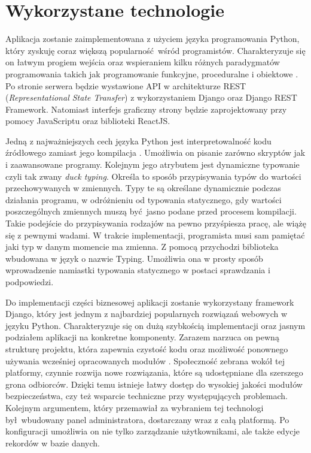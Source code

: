 \section{Wykorzystane technologie}
Aplikacja zostanie zaimplementowana z użyciem języka programowania Python, który zyskuję coraz większą popularność wśród programistów. Charakteryzuje się on łatwym progiem wejścia oraz wspieraniem kilku różnych paradygmatów programowania takich jak programowanie funkcyjne, proceduralne i obiektowe \cite{book_3}. Po stronie serwera będzie wystawione API w architekturze REST (\textit{Representational State Transfer}) z wykorzystaniem Django oraz Django REST Framework. Natomiast interfejs graficzny strony będzie zaprojektowany przy pomocy JavaScriptu oraz biblioteki ReactJS.

Jedną z najważniejszych cech języka Python jest interpretowalność kodu źródłowego zamiast jego kompilacja \cite{misc_python}. Umożliwia on pisanie zarówno skryptów jak i zaawansowane programy. Kolejnym jego atrybutem jest dynamiczne typowanie czyli tak zwany \textit{duck typing}. Określa to sposób przypisywania typów do wartości przechowywanych w zmiennych. Typy te są określane dynamicznie podczas działania programu, w odróżnieniu od typowania statycznego, gdy wartości poszczególnych zmiennych muszą być jasno podane przed procesem kompilacji. Takie podejście do przypisywania rodzajów na pewno przyśpiesza pracę, ale wiążę się z pewnymi wadami. W trakcie implementacji, programista musi sam pamiętać jaki typ w danym momencie ma zmienna. Z pomocą przychodzi biblioteka wbudowana w język o nazwie Typing. Umożliwia ona w prosty sposób wprowadzenie namiastki typowania statycznego w postaci sprawdzania i podpowiedzi.

Do implementacji części biznesowej aplikacji zostanie wykorzystany framework Django, który jest jednym z najbardziej popularnych rozwiązań webowych w języku Python. Charakteryzuje się on dużą szybkością implementacji oraz jasnym podziałem aplikacji na konkretne komponenty. Zarazem narzuca on pewną strukturę projektu, która zapewnia czystość kodu oraz możliwość ponownego używania wcześniej opracowanych modułów \cite{misc_django}. Społeczność zebrana wokół tej platformy, czynnie rozwija nowe rozwiązania, które są udostępniane dla szerszego grona odbiorców. Dzięki temu istnieje łatwy dostęp do wysokiej jakości modułów bezpieczeństwa, czy też wsparcie techniczne przy występujących problemach. Kolejnym argumentem, który przemawiał za wybraniem tej technologi był wbudowany panel administratora, dostarczany wraz z całą platformą. Po konfiguracji umożliwia on nie tylko zarządzanie użytkownikami, ale także edycje rekordów w bazie danych. 

